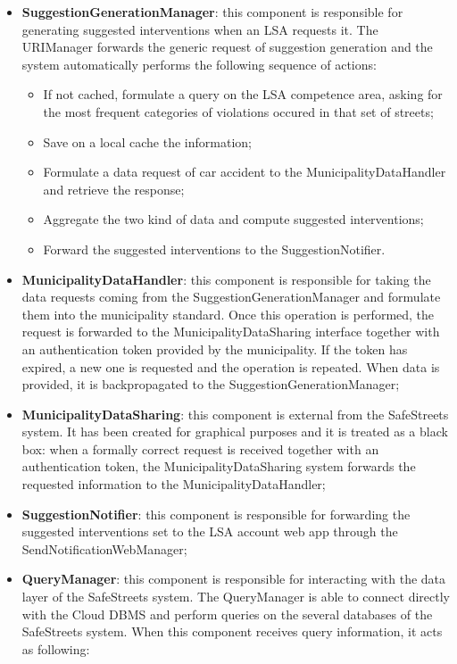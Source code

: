 \begin{itemize}
    \item \textbf{SuggestionGenerationManager}: this component is responsible for generating suggested interventions when an LSA requests it. The URIManager forwards the generic request of suggestion generation and the system automatically performs the following sequence of actions: 
    \begin{itemize}
        \item If not cached, formulate a query on the LSA competence area, asking for the most frequent categories of violations occured in that set of streets;
        \item Save on a local cache the information;
        \item Formulate a data request of car accident to the MunicipalityDataHandler and retrieve the response;
        \item Aggregate the two kind of data and compute suggested interventions;
        \item Forward the suggested interventions to the SuggestionNotifier.
    \end{itemize}
    \item \textbf{MunicipalityDataHandler}: this component is responsible for taking the data requests coming from the SuggestionGenerationManager and formulate them into the municipality standard. Once this operation is performed, the request is forwarded to the MunicipalityDataSharing interface together with an authentication token provided by the municipality. If the token has expired, a new one is requested and the operation is repeated. When data is provided, it is backpropagated to the SuggestionGenerationManager;
    \item \textbf{MunicipalityDataSharing}: this component is external from the SafeStreets system. It has been created for graphical purposes and it is treated as a black box: when a formally correct request is received together with an authentication token, the MunicipalityDataSharing system forwards the requested information to the MunicipalityDataHandler;
    \item \textbf{SuggestionNotifier}: this component is responsible for forwarding the suggested interventions set to the LSA account web app through the SendNotificationWebManager;
    \item \textbf{QueryManager}: this component is responsible for interacting with the data layer of the SafeStreets system. The QueryManager is able to connect directly with the Cloud DBMS and perform queries on the several databases of the SafeStreets system. When this component receives query information, it acts as following: 

\end{itemize}
